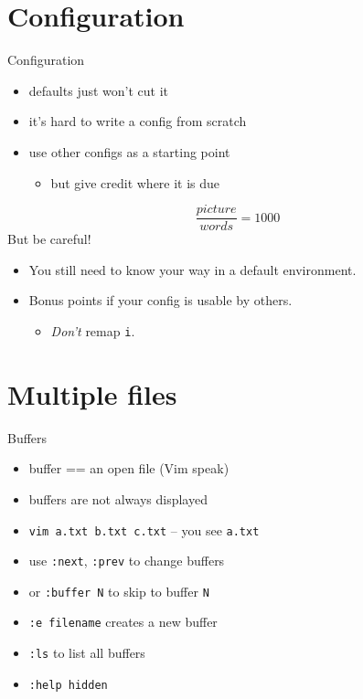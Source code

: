 \documentclass{beamer}
\begin{document}
\section{Configuration}
\begin{frame}{Configuration}
  \begin{itemize}
    \item defaults just won't cut it
    \item it's hard to write a config from scratch
    \item use other configs as a starting point
    \pause
    \begin{itemize}
      \item but give credit where it is due
    \end{itemize}
  \end{itemize}
  \pause
  $$ \frac{picture}{words} = 1000 $$
  \pause
But be careful!
  \begin{itemize}
    \item You still need to know your way in a default environment.
    \pause
    \item Bonus points if your config is usable by others.
    \pause
    \begin{itemize}
      \item \emph{Don't} remap \texttt{i}.
    \end{itemize}
  \end{itemize}
\end{frame}

\section{Multiple files}

\begin{frame}{Buffers}
  \begin{itemize}
    \item buffer == an open file (Vim speak)
    \item buffers are not always displayed
    \item \texttt{vim a.txt b.txt c.txt} -- you see \texttt{a.txt}
    \item use \texttt{:next}, \texttt{:prev} to change buffers
    \item or \texttt{:buffer N} to skip to buffer \texttt{N}
    \item \texttt{:e filename} creates a new buffer
    \item \texttt{:ls} to list all buffers
    \item \texttt{:help hidden}
  \end{itemize}
\end{frame}
\end{document}
